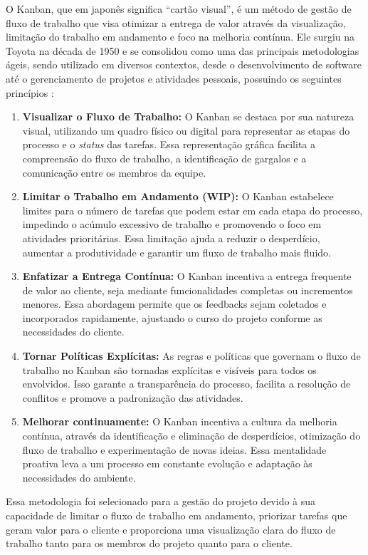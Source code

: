 O Kanban, que em japonês significa \enquote{cartão visual}, é um método de gestão de 
fluxo de trabalho que visa otimizar a entrega de valor através da visualização, 
limitação do trabalho em andamento e foco na melhoria contínua. 
Ele surgiu na Toyota na década de 1950 e se consolidou como uma das principais 
metodologias ágeis, sendo utilizado em diversos contextos, desde o desenvolvimento de 
software até o gerenciamento de projetos e atividades pessoais, possuindo os seguintes 
princípios \cite{kanban:explicacao}:
\begin{enumerate}
    \item \textbf{Visualizar o Fluxo de Trabalho:} O Kanban se destaca por sua natureza visual, utilizando um quadro 
    físico ou digital para representar as etapas do processo e o \textit{status} das tarefas. Essa representação gráfica 
    facilita a compreensão do fluxo de trabalho, a identificação de gargalos e a comunicação entre os membros da equipe.
    
    \item \textbf{Limitar o Trabalho em Andamento (WIP):} O Kanban estabelece limites para o número de tarefas que podem 
    estar em cada etapa do processo, impedindo o acúmulo excessivo de trabalho e promovendo o foco em atividades 
    prioritárias. Essa limitação ajuda a reduzir o desperdício, aumentar a produtividade e garantir um fluxo de trabalho 
    mais fluido.
    
    \item \textbf{Enfatizar a Entrega Contínua:} O Kanban incentiva a entrega frequente de valor ao cliente, seja 
    mediante funcionalidades completas ou incrementos menores. Essa abordagem permite que os feedbacks sejam coletados e 
    incorporados rapidamente, ajustando o curso do projeto conforme as necessidades do cliente.
    
    \item \textbf{Tornar Políticas Explícitas:} As regras e políticas que governam o fluxo de trabalho no Kanban são 
    tornadas explícitas e visíveis para todos os envolvidos. Isso garante a transparência do processo, facilita a 
    resolução de conflitos e promove a padronização das atividades.

    \item \textbf{Melhorar continuamente:} O Kanban incentiva a cultura da melhoria contínua, através da identificação e 
    eliminação de desperdícios, otimização do fluxo de trabalho e experimentação de novas ideias. Essa mentalidade 
    proativa leva a um processo em constante evolução e adaptação às necessidades do ambiente.
    
\end{enumerate}

Essa metodologia foi selecionado para a gestão do projeto devido à sua capacidade de limitar o fluxo de trabalho em andamento, 
priorizar tarefas que geram valor para o cliente e proporciona uma visualização clara do fluxo de trabalho tanto para os 
membros do projeto quanto para o cliente.

